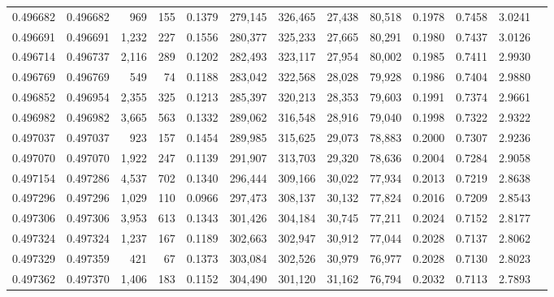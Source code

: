 \begin{tabular}{rrrrrrrrrrrrr}
0.496682 & 0.496682 &   969 &   155 &                                     0.1379 & 279,145 & 326,465 &  27,438 &  80,518 & 0.1978 & 0.7458 & 3.0241 \\
0.496691 & 0.496691 & 1,232 &   227 &                                     0.1556 & 280,377 & 325,233 &  27,665 &  80,291 & 0.1980 & 0.7437 & 3.0126 \\
0.496714 & 0.496737 & 2,116 &   289 &                                     0.1202 & 282,493 & 323,117 &  27,954 &  80,002 & 0.1985 & 0.7411 & 2.9930 \\
0.496769 & 0.496769 &   549 &    74 &                                     0.1188 & 283,042 & 322,568 &  28,028 &  79,928 & 0.1986 & 0.7404 & 2.9880 \\
0.496852 & 0.496954 & 2,355 &   325 &                                     0.1213 & 285,397 & 320,213 &  28,353 &  79,603 & 0.1991 & 0.7374 & 2.9661 \\
0.496982 & 0.496982 & 3,665 &   563 &                                     0.1332 & 289,062 & 316,548 &  28,916 &  79,040 & 0.1998 & 0.7322 & 2.9322 \\
0.497037 & 0.497037 &   923 &   157 &                                     0.1454 & 289,985 & 315,625 &  29,073 &  78,883 & 0.2000 & 0.7307 & 2.9236 \\
0.497070 & 0.497070 & 1,922 &   247 &                                     0.1139 & 291,907 & 313,703 &  29,320 &  78,636 & 0.2004 & 0.7284 & 2.9058 \\
0.497154 & 0.497286 & 4,537 &   702 &                                     0.1340 & 296,444 & 309,166 &  30,022 &  77,934 & 0.2013 & 0.7219 & 2.8638 \\
0.497296 & 0.497296 & 1,029 &   110 &                                     0.0966 & 297,473 & 308,137 &  30,132 &  77,824 & 0.2016 & 0.7209 & 2.8543 \\
0.497306 & 0.497306 & 3,953 &   613 &                                     0.1343 & 301,426 & 304,184 &  30,745 &  77,211 & 0.2024 & 0.7152 & 2.8177 \\
0.497324 & 0.497324 & 1,237 &   167 &                                     0.1189 & 302,663 & 302,947 &  30,912 &  77,044 & 0.2028 & 0.7137 & 2.8062 \\
0.497329 & 0.497359 &   421 &    67 &                                     0.1373 & 303,084 & 302,526 &  30,979 &  76,977 & 0.2028 & 0.7130 & 2.8023 \\
0.497362 & 0.497370 & 1,406 &   183 &                                     0.1152 & 304,490 & 301,120 &  31,162 &  76,794 & 0.2032 & 0.7113 & 2.7893 \\

\end{tabular}
